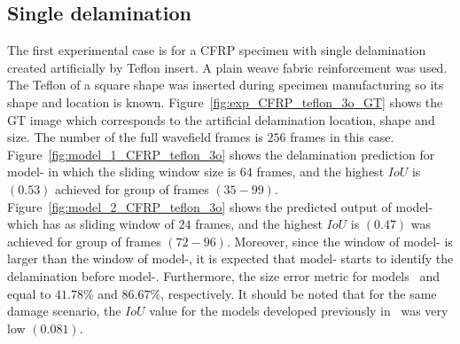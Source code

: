 \subsection{Single delamination}
The first experimental case is for a CFRP specimen with single delamination created artificially by Teflon insert. 
A plain weave fabric reinforcement was used.
The Teflon of a square shape was inserted during specimen manufacturing so its shape and location is known.
Figure~\ref{fig:exp_CFRP_teflon_3o_GT} shows the GT image which corresponds to the artificial delamination location, shape and size.
The number of the full wavefield frames is \(256\) frames in this case.
Figure~\ref{fig:model_1_CFRP_teflon_3o} shows the delamination prediction for model- in which the sliding window size is \(64\) frames, and the highest \(IoU\) is \((0.53)\) achieved for group of frames \((35-99)\).
Figure~\ref{fig:model_2_CFRP_teflon_3o} shows the predicted output of model- which has as sliding window of \(24\) frames, and the highest \(IoU\) is \((0.47)\) was achieved for group of frames \((72-96)\).
Moreover, since the window of model- is larger than the window of model-, it is expected that model- starts to identify the delamination before model-.
Furthermore, the size error metric for models~ and~ equal to \(41.78 \%\) and \(86.67\%\), respectively.
It should be noted that for the same damage scenario, the \(IoU\) value for the models developed previously in~\cite{Ijjeh2021} was very low \((0.081)\).

